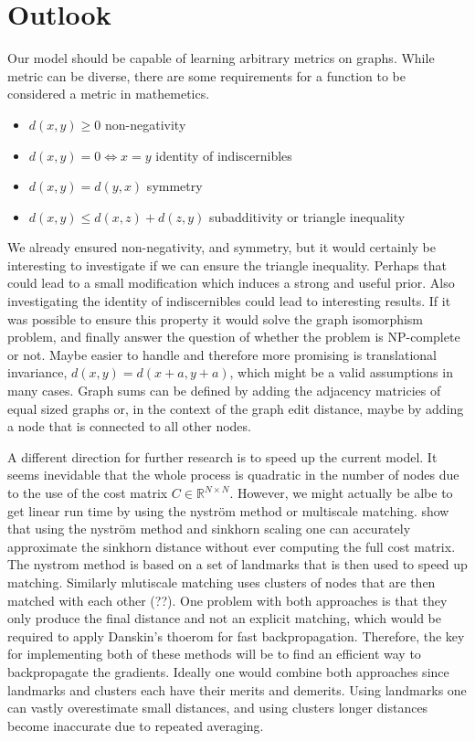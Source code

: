 \section{Outlook}

Our model should be capable of learning arbitrary metrics on graphs. While metric can be diverse, there are some requirements for a function to be considered a metric in mathemetics.
\begin{itemize}
    \itemsep0em
    \item $d(x,y) \ge 0$ non-negativity
    \item $d(x,y) = 0 \Leftrightarrow x = y$ identity of indiscernibles
    \item $d(x,y)  = d(y,x)$ symmetry
    \item $d(x,y) \le d(x,z) + d(z, y)$ subadditivity or triangle inequality
\end{itemize}
We already ensured non-negativity, and symmetry, but it would certainly be interesting to investigate if we can ensure the triangle inequality. Perhaps that could lead to a small modification which induces a strong and useful prior. Also investigating the identity of indiscernibles could lead to interesting results. If it was possible to ensure this property it would solve the graph isomorphism problem, and finally answer the question of whether the problem is NP-complete or not. Maybe easier to handle and therefore more promising is translational invariance, $d(x,y) = d(x+a,y+a)$, which might be a valid assumptions in many cases. Graph sums can be defined by adding the adjacency matricies of equal sized graphs \cite{graph_sum2004} or, in the context of the graph edit distance, maybe by adding a node that is connected to all other nodes.

A different direction for further research is to speed up the current model. It seems inevidable that the whole process is quadratic in the number of nodes due to the use of the cost matrix $C \in \mathbb{R}^{N \times N}$. However, we might actually be albe to get linear run time by using the nystr{\"{o}}m method or multiscale matching. \cite{nytrom2019} show that using the nystr{\"{o}}m method and sinkhorn scaling one can accurately approximate the sinkhorn distance without ever computing the full cost matrix. The nystrom method is based on a set of landmarks that is then used to speed up matching. Similarly mlutiscale matching uses clusters of nodes that are then matched with each other  (\citealp{}??). One problem with both approaches is that they only produce the final distance and not an explicit matching, which would be required to apply Danskin's thoerom for fast backpropagation. Therefore, the key for implementing both of these methods will be to find an efficient way to backpropagate the gradients. Ideally one would combine both approaches since landmarks and clusters each have their merits and demerits. Using landmarks one can vastly overestimate small distances, and using clusters longer distances become inaccurate due to repeated averaging.
